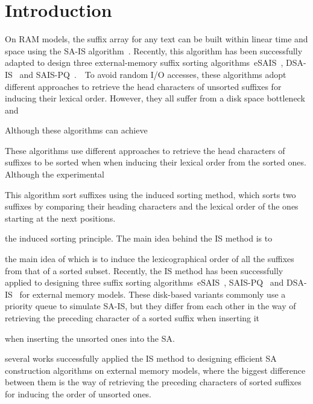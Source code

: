 \documentclass[10pt,journal,compsoc]{IEEEtran}
\begin{document}
\maketitle

\IEEEdisplaynontitleabstractindextext

\IEEEpeerreviewmaketitle

\section{Introduction}\label{sec:introduction}

On RAM models, the suffix array for any text can be built within linear time and space using the SA-IS algorithm~\cite{Nong11}. Recently, this algorithm has been successfully adapted to design three external-memory suffix sorting algorithms~eSAIS~\cite{Bingmann12}, DSA-IS~\cite{Nong15} and SAIS-PQ~\cite{Liu15}.　To avoid random I/O accesses, these algorithms adopt different approaches to retrieve the head characters of unsorted suffixes for inducing their lexical order. However, they all suffer from a disk space bottleneck and 


Although these algorithms can achieve 

These algorithms use different approaches to retrieve the head characters of suffixes to be sorted when  when inducing their lexical order from the sorted ones. Although the experimental  



This algorithm sort suffixes using the induced sorting method, which sorts two suffixes by comparing their heading characters and the lexical order of the ones starting at the next positions.


 the induced sorting principle. The  main idea behind the IS method is to 

 the main idea of which is to induce the lexicographical order of all the suffixes from that of a sorted subset. Recently, the IS method has been successfully applied to designing three suffix sorting algorithms~eSAIS~\cite{Bingmann12}, SAIS-PQ~\cite{Liu15} and DSA-IS~\cite{Nong15} for external memory models. These disk-based variants commonly use a priority queue to simulate SA-IS, but they differ from each other in the way of retrieving the preceding character of a sorted suffix when inserting it 

 when inserting the unsorted ones into the SA. 


several works successfully applied the IS method to designing efficient SA construction algorithms on external memory models, where the biggest difference between them is the way of retrieving the preceding characters of sorted suffixes for inducing the order of unsorted ones.
\end{document}
